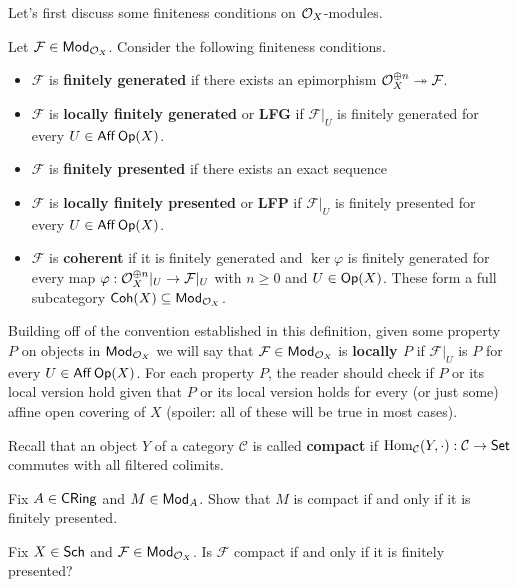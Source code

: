 \documentclass[11pt]{article}
\newcommand{\CC}{\mathcal{C}}
\renewcommand{\F}{\mathcal{F}}
\renewcommand{\phi}{\varphi}
\begin{document}
Let's first discuss some finiteness conditions on $\mathcal{O}_X$-modules.

\begin{definition}
Let $\F\in\Mod_{\O_X}$. Consider the following finiteness conditions.
\begin{itemize}
\item $\F$ is \textbf{finitely generated} if there exists an epimorphism $\O_X^{\oplus n}\surj\F$. 

\item $\F$ is \textbf{locally finitely generated} or \textbf{LFG} if $\F|_U$ is finitely generated for every $U\in\operatorname{\mathsf{Aff}}\operatorname{\mathsf{Op}}(X)$.

\item $\F$ is \textbf{finitely presented} if there exists an exact sequence 
\begin{center}
\end{center}

\item $\F$ is \textbf{locally finitely presented} or \textbf{LFP} if $\F|_U$ is finitely presented for every $U\in\operatorname{\mathsf{Aff}}\operatorname{\mathsf{Op}}(X)$.

\item $\F$ is \textbf{coherent} if it is finitely generated and $\ker\phi$ is finitely generated for every map $\phi: \O_X^{\oplus n}|_U\to\F|_U$ with $n\geq0$ and $U\in\operatorname{\mathsf{Op}}(X)$. These form a full subcategory $\operatorname{\mathsf{Coh}}(X)\subseteq\operatorname{\mathsf{Mod}}_{\mathcal{O}_X}$.
\end{itemize}
\end{definition}

Building off of the convention established in this definition, given some property $P$ on objects in $\operatorname{\mathsf{Mod}}_{\mathcal{O}_X}$ we will say that $\F\in\Mod_{\O_X}$ is \textbf{locally $P$} if $\F|_U$ is $P$ for every $U\in\operatorname{\mathsf{Aff}}\operatorname{\mathsf{Op}}(X)$. For each property $P$, the reader should check if $P$ or its local version hold given that $P$ or its local version holds for every (or just some) affine open covering of $X$ (spoiler: all of these will be true in most cases).

\begin{remark}
Recall that an object $Y$ of a category $\CC$ is called \textbf{compact} if $\Hom_{\CC}(Y,\cdot): \CC\to\Set$ commutes with all filtered colimits.
\begin{enum}{\alph}
\item Fix $A\in\operatorname{\mathsf{CRing}}$ and $M\in\operatorname{\mathsf{Mod}}_A$. Show that $M$ is compact if and only if it is finitely presented.

\item Fix $X\in\operatorname{\mathsf{Sch}}$ and $\F\in\Mod_{\O_X}$. Is $\F$ compact if and only if it is finitely presented?
\end{enum}
\end{remark}
\end{document}
